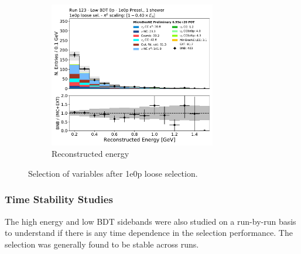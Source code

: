 \begin{figure}[H]
\begin{subfigure}{0.3\textwidth}
    \end{subfigure}
    \begin{subfigure}{0.3\textwidth}
    \includegraphics[width=0.8\textwidth]{1e0p/Low_BDT_Sideband/loose_selection/reco_e_note.pdf}
    \caption{Reconstructed energy}
    \end{subfigure}
    \caption{Selection of variables after 1e0p loose selection.} 
    \label{fig:low_0pbdt_sideband_plots_loose}
\end{figure}

\subsubsection{Time Stability Studies}
The high energy and low BDT sidebands were also studied on a run-by-run basis to understand if there is any time dependence in the selection performance. The selection was generally found to be stable across runs. 


